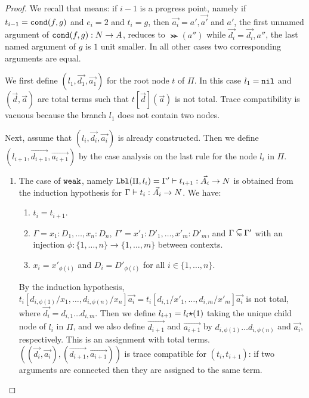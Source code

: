 \begin{proof}
 We recall that  means: 
 if $i-1$ is a progress point, namely if $t_{i-1}={\tt cond}(f,g)$ and $e_i=2$ 
    and $t_i=g$,
    then $\vec{a_i} = a',\vec{a'}$ 
    and $a'$, the first unnamed argument of ${\tt cond}(f,g):{N} \rightarrow A$, reduces to $\Succ(a'')$
     while $\vec{d_i} = \vec{d_i},a''$, 
     the last named argument of $g$ is $1$ unit smaller.
  In all other cases two corresponding arguments are equal.

  We first define $(l_1,\vec{d_1},\vec{a_1})$ for the root node $t$ of $\Pi$.
  In this case $l_1 = {\tt nil}$ 
   and $(\vec{d},\vec{a})$ are total terms such that $t[\vec{d}](\vec{a})$ is not total.
  Trace compatibility is vacuous because the branch $l_1$ does not contain two nodes.

  Next, assume that $(l_i,\vec{d_i},\vec{a_i})$ is already constructed.
  Then we define $(l_{i+1},\vec{d_{i+1}},\vec{a_{i+1}})$ by the case analysis on
  the last rule for the node $l_i$ in $\Pi$. 




\begin{enumerate}

\item
  The case of ${\tt weak}$, namely
  ${\tt Lbl}(\Pi,l_i) = \Gamma'\vdash t_{i+1}:\vec{A_i}\rightarrow{N}$
  is obtained from the induction hypothesis for
  $\Gamma\vdash t_{i}:\vec{A_i}\rightarrow{N}$. We have:

\begin{enumerate}
\item
 $t_i = t_{i+1}$. 
\item
  $\Gamma = x_1:D_1,\ldots,x_n:D_n$, $\Gamma' = x'_1:D'_1,\ldots,x'_m:D'_m$, and $\Gamma \subseteqsim \Gamma'$
  with an injection $\phi:\{1,\ldots,n\}\to\{1,\ldots,m\}$ between contexts. 
\item
  $x_i = x'_{\phi(i)}$ and $D_i = D'_{\phi(i)}$ for all $i \in \{1,\ldots,n\}$.
\end{enumerate}

  By the induction hypothesis, 
  $t_i[d_{i,\phi(1)}/x_1,\ldots,d_{i,\phi(n)}/x_n]\vec{a_i} 
   = t_i[d_{i,1}/x'_1,\ldots,d_{i,m}/x'_m]\vec{a_i}$ is not total,
  where $\vec{d_i} = d_{i,1}\ldots d_{i,m}$.
  Then we define $l_{i+1} = l_i{\star}(1)$ taking the unique child node of $l_i$ in $\Pi$, and we
  also define $\vec{d_{i+1}}$ and $\vec{a_{i+1}}$ by $d_{i,\phi(1)}\ldots d_{i,\phi(n)}$
  and $\vec{a_i}$, respectively. This is an assignment with total terms.
  $((\vec{d_i},\vec{a_i}),(\vec{d_{i+1}},\vec{a_{i+1}}))$
  is trace compatible for $(t_i,t_{i+1})$: if two arguments are connected then they are assigned
  to the same term. 


\end{enumerate}
\end{proof}
